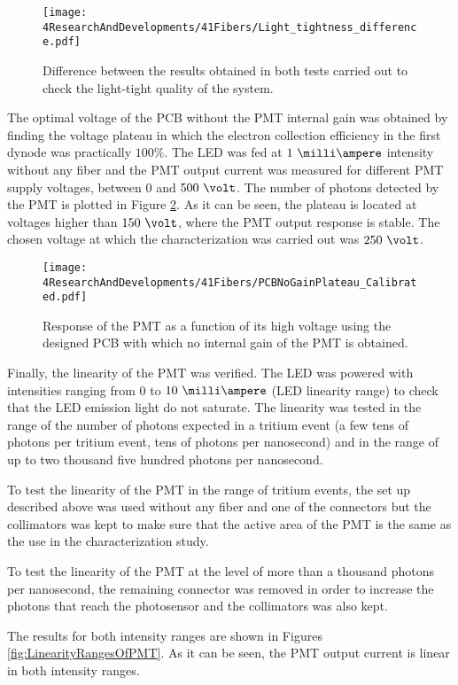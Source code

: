 \begin{figure}[h]
\centering
\texttt{[image: 4ResearchAndDevelopments/41Fibers/Light\_tightness\_difference.pdf]}
\caption{Difference between the results obtained in both tests carried out to check the light-tight quality of the system.\label{fig:LightTightnessTest}}
\end{figure}

The optimal voltage of the PCB without the PMT internal gain was obtained by finding the voltage plateau in which the electron collection efficiency in the first dynode was practically $100\%$. The LED was fed at $1~\milli\ampere$ intensity without any fiber and the PMT output current was measured for different PMT supply voltages, between $0$ and $500~\volt$. The number of photons detected by the PMT is plotted in Figure \ref{fig:PlateauNoGainPMT}. As it can be seen, the plateau is located at voltages higher than $150~\volt$, where the PMT output response is stable. The chosen voltage at which the characterization was carried out was $250~\volt$.


\begin{figure}[h]
\centering
\texttt{[image: 4ResearchAndDevelopments/41Fibers/PCBNoGainPlateau\_Calibrated.pdf]}
\caption{Response of the PMT as a function of its high voltage using the designed PCB with which no internal gain of the PMT is obtained.\label{fig:PlateauNoGainPMT}}
\end{figure}

Finally, the linearity of the PMT was verified. The LED was powered with intensities ranging from 0 to $10~\milli\ampere$ (LED linearity range) to check that the LED emission light do not saturate. The linearity was tested in the range of the number of photons expected in a tritium event (a few tens of photons per tritium event, tens of photons per nanosecond) and in the range of up to two thousand five hundred photons per nanosecond.

To test the linearity of the PMT in the range of tritium events, the set up described above was used without any fiber and one of the connectors but the collimators was kept to make sure that the active area of the PMT is the same as the use in the characterization study.

To test the linearity of the PMT at the level of more than a thousand photons per nanosecond, the remaining connector was removed in order to increase the photons that reach the photosensor and the collimators was also kept.

The results for both intensity ranges are shown in Figures \ref{fig:LinearityRangesOfPMT}. As it can be seen, the PMT output current is linear in both intensity ranges.

